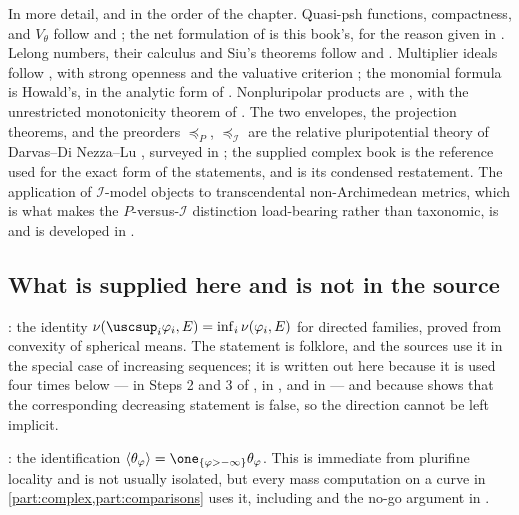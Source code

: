 In more detail, and in the order of the chapter.  Quasi-psh functions,
compactness, and \(V_\theta\) follow \cite{GZ17} and
\cite[\S1]{BEGZ10}; the net formulation of
 is this book's, for the reason given
in .  Lelong numbers, their calculus and Siu's
theorems follow \cite[Chapter~III]{DemBook} and \cite{Siu74,Dem93}.
Multiplier ideals follow \cite{Nad89,Nad90,DemBook}, with strong openness
\cite{GZ15} and the valuative criterion \cite{Bou17}; the monomial
formula is Howald's, in the analytic form of \cite{Guenancia12}.
Nonpluripolar products are \cite{BEGZ10}, with the unrestricted
monotonicity theorem of \cite{DDNL18mono}.  The two envelopes, the
projection theorems, and the preorders \(\preceq_P\),
\(\preceq_{\mathcal I}\) are the relative pluripotential theory of
Darvas--Di Nezza--Lu \cite{DDNL18mono,DDNL18big,DDNL18fullmass,%
DDNLmetric}, surveyed in \cite{DDNLsurv}; the supplied complex book
\cite{XiaBook} is the reference used for the exact form of the
statements, and  is its condensed
restatement.  The application of \(\mathcal I\)-model objects to
transcendental non-Archimedean metrics, which is what makes the
\(P\)-versus-\(\mathcal I\) distinction load-bearing rather than
taxonomic, is \cite{DXZ23,DX24,Xia23Operations} and is developed in
.

\subsection{What is supplied here and is not in the source}
\label{sec:ch51-additions}

: the identity
\(\nu(\uscsup_i\varphi_i,E)=\inf_i\nu(\varphi_i,E)\) for directed
families, proved from convexity of spherical means.  The statement is
folklore, and the sources use it in the special case of increasing
sequences; it is written out here because it is used four times below ---
in Steps 2 and 3 of , in
, and in
 --- and because
 shows that the corresponding
decreasing statement is false, so the direction cannot be left implicit.

: the identification
\(\langle\theta_\varphi\rangle
=\one_{\{\varphi>-\infty\}}\theta_\varphi\).  This is immediate from
plurifine locality and is not usually isolated, but every mass
computation on a curve in \cref{part:complex,part:comparisons} uses it,
including  and the no-go argument in
.

